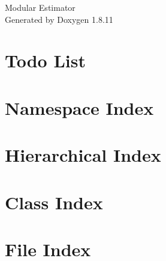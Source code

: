 \documentclass[twoside]{book}
\newcommand{\+}{\discretionary{\mbox{\scriptsize$\hookleftarrow$}}{}{}}
\newcommand{\clearemptydoublepage}{%
  \newpage{\pagestyle{empty}\cleardoublepage}%
}
\begin{document}
\hypersetup{pageanchor=false,
             bookmarksnumbered=true,
             pdfencoding=unicode
            }
\begin{titlepage}
\vspace*{7cm}
\begin{center}%
{\Large Modular Estimator }\\
\vspace*{1cm}
{\large Generated by Doxygen 1.8.11}\\
\end{center}
\end{titlepage}
\clearemptydoublepage
\tableofcontents
\clearemptydoublepage
{}
\hypersetup{pageanchor=true}

\chapter{Todo List}
\label{todo}
\hypertarget{todo}{}

\chapter{Namespace Index}

\chapter{Hierarchical Index}

\chapter{Class Index}

\chapter{File Index}

\end{document}
